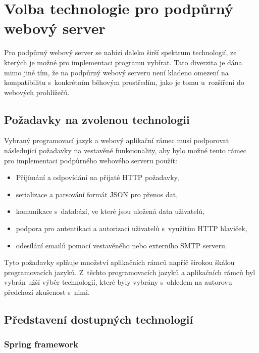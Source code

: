 \section{Volba technologie pro podpůrný webový server}

Pro podpůrný webový server se nabízí daleko širší spektrum technologií, ze kterých je možné pro implementaci programu vybírat. Tato diverzita je dána mimo jiné tím, že na podpůrný webový serveru není kladeno omezení na kompatibilitu s~konkrétním běhovým prostředím, jako je tomu u~rozšíření do webových prohlížečů. 

\subsection{Požadavky na zvolenou technologii}\label{sec:pozadavky-na-zvolenou-technologii}

Vybraný programovací jazyk a webový aplikační rámec musí podporovat následující požadavky na vestavěné funkcionality, aby bylo možné tento rámec pro implementaci podpůrného webového serveru použít:

\begin{itemize}
    \item Přijímání a odpovídání na přijaté HTTP požadavky,
    \item serializace a parsování formát JSON pro přenos dat,
    \item komunikace s~databází, ve které jsou uložená data uživatelů,
    \item podpora pro autentikaci a autorizaci uživatelů s~využitím HTTP hlaviček,
    \item odesílání emailů pomocí vestavěného nebo externího SMTP serveru.
\end{itemize}

Tyto požadavky splňuje množství aplikačních rámců napříč širokou škálou programovacích jazyků. Z~těchto programovacích jazyků a aplikačních rámců byl vybrán užší výběr technologií, které byly vybrány s~ohledem na autorovu předchozí zkušenost s~nimi.


\subsection{Představení dostupných technologií}

\subsubsection{Spring framework}\label{sec:spring-boot}


